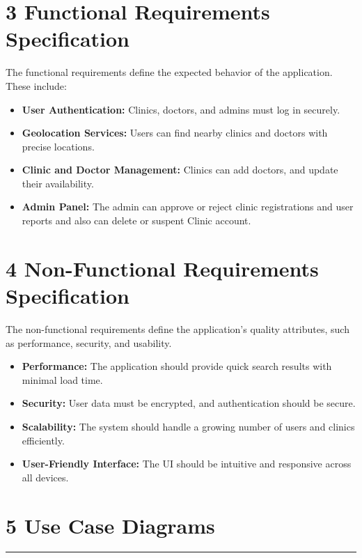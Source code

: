 \documentclass[12pt]{report}
\begin{document}
\section*{\textbf{3 Functional Requirements Specification}}

\noindent The functional requirements define the expected behavior of the application. These include:

\begin{itemize}
	\item \textbf{User Authentication:} Clinics, doctors, and admins must log in securely.
	\item \textbf{Geolocation Services:} Users can find nearby clinics and doctors with precise locations.
	\item \textbf{Clinic and Doctor Management:} Clinics can add doctors, and update their availability.
	\item \textbf{Admin Panel:} The admin can approve or reject clinic registrations and user reports and also can delete or suspent Clinic account.
\end{itemize}

\section*{\textbf{4 Non-Functional Requirements Specification}}
\noindent The non-functional requirements define the application's quality attributes, such as performance, security, and usability.

\begin{itemize}
	\item \textbf{Performance:} The application should provide quick search results with minimal load time.
	\item \textbf{Security:} User data must be encrypted, and authentication should be secure.
	\item \textbf{Scalability:} The system should handle a growing number of users and clinics efficiently.
	\item \textbf{User-Friendly Interface:} The UI should be intuitive and responsive across all devices.
\end{itemize}

\newpage
\section*{\textbf{5 Use Case Diagrams}}
\rule{0.45\linewidth}{0.7pt}
\end{document}
